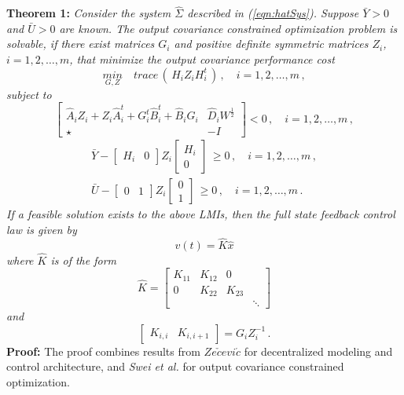 \documentclass[11pt]{ucthesis}
\begin{document}
\noindent
\textbf{Theorem 1:} \textit{Consider the system $\hat{\Sigma}$ described in (\ref{eqn:hatSys}). Suppose $\bar{Y}>0$ and $\bar{U}>0$ are known. The output covariance constrained optimization problem is solvable, if there exist matrices $G_i$ and positive definite symmetric matrices $Z_i$, $i=1,2,\dots,m$, that minimize the output covariance performance cost}
\begin{equation}	\label{eqn:LMImin}
\underset{G,Z}{min}\quad trace\,(\,H_i Z_i H_{i}^{t}\,)\,,\quad i = 1,2,\dots, m\,,
\end{equation}
\textit{subject to}
\begin{equation}
\begin{bmatrix}
\hat{A}_i Z_i+Z_i \hat{A}_{i}^{t}+G_i^t \hat{B}_{i}^t+\hat{B}_i G_i &\hat{D}_i W^{\frac{1}{2}}\\\star&-I
\end{bmatrix}<0\,, \quad i = 1,2,\dots, m \,,
\label{eqn:LMILap}
\end{equation}
\begin{equation}
\begin{matrix}
\bar{Y}- \left [ \begin{array}{cc} H_i & 0 \end{array} \right ] Z_i \left [ \begin{array}{c} H_i \\ 0 \end{array} \right ] \,\geq 0 \,, \quad i = 1,2,\dots, m \,, \\
\bar{U}- \left [ \begin{array}{cc} 0 & 1 \end{array} \right ]Z_i \left [ \begin{array}{c} 0 \\ 1 \end{array} \right ] \,\geq 0 \,, \quad i = 1,2,\dots, m \,.
\end{matrix}
\label{eqn:LMIConst}
\end{equation}
\textit{If a feasible solution exists to the above LMIs, then the full state feedback control law is given by} 
\begin{equation}
v(t) = \hat{K} \hat{x}
\end{equation}
\textit{where $\hat{K}$ is of the form}
\begin{equation}
\hat{K} = \begin{bmatrix}
K_{11}&K_{12}&0\\0&K_{22}&K_{23}\\&&&\ddots
\end{bmatrix}
\label{eqn:Khat}
\end{equation}
\textit{and}
\begin{equation}
\begin{bmatrix}
K_{i,i}&K_{i,i+1}
\end{bmatrix}=G_i Z_i^{-1} \,.
\end{equation}
\noindent
{\bf Proof:} The proof combines results from $Ze\check{c}evi\acute{c}$\cite{zevcevic2005new} for decentralized modeling and control architecture, and {\it Swei et al.} \cite{swei2015lmi} for output covariance constrained optimization.
\end{document}
